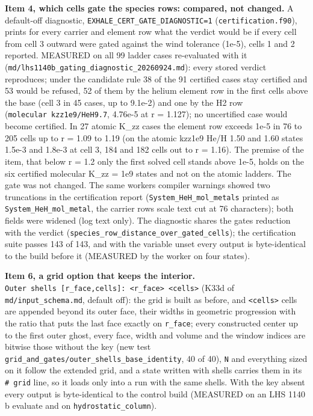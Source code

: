 \documentclass[english,a4paper]{my_memo}
\begin{document}
\textbf{Item 4, which cells gate the species rows: compared, not changed.} A
default-off diagnostic, \texttt{EXHALE\_CERT\_GATE\_DIAGNOSTIC=1} (\texttt{certification.f90}),
prints for every carrier and element row what the verdict would be if every
cell from cell 3 outward were gated against the wind tolerance (1e-5), cells 1
and 2 reported. MEASURED on all 99 ladder cases re-evaluated with it
(\texttt{md/lhs1140b\_gating\_diagnostic\_20260924.md}): every stored verdict
reproduces; under the candidate rule 38 of the 91 certified cases stay
certified and 53 would be refused, 52 of them by the helium element row in
the first cells above the base (cell 3 in 45 cases, up to 9.1e-2) and one by
the H2 row (\texttt{molecular\ kzz1e9/HeH9.7}, 4.76e-5 at r = 1.127); no uncertified
case would become certified. In 27 atomic K\_zz cases the element row exceeds
1e-5 in 76 to 205 cells up to r = 1.09 to 1.19 (on the atomic kzz1e9 He/H 1.50
and 1.60 states 1.5e-3 and 1.8e-3 at cell 3, 184 and 182 cells out to
r = 1.16). The premise of the item, that below r = 1.2 only the first solved
cell stands above 1e-5, holds on the six certified molecular K\_zz = 1e9
states and not on the atomic ladders. The gate was not changed. The same
worker\textquotesingle s compiler warnings showed two truncations in the certification report
(\texttt{System\_HeH\_mol\_metals} printed as \texttt{System\_HeH\_mol\_metal}, the carrier row\textquotesingle s
scale text cut at 76 characters); both fields were widened (log text only).
The diagnostic shares the gate\textquotesingle s reduction with the verdict
(\texttt{species\_row\_distance\_over\_gated\_cells}); the certification suite passes 143
of 143, and with the variable unset every output is byte-identical to the
build before it (MEASURED by the worker on four states).

\textbf{Item 6, a grid option that keeps the interior.} \texttt{Outer\ shells\ {[}r\_face,cells{]}:\ \textless{}r\_face\textgreater{}\ \textless{}cells\textgreater{}} (K33d of \texttt{md/input\_schema.md}, default
off): the grid is built as before, and \texttt{\textless{}cells\textgreater{}} cells are appended beyond its
outer face, their widths in geometric progression with the ratio that puts
the last face exactly on \texttt{r\_face}; every constructed center up to the first
outer ghost, every face, width and volume and the window indices are bitwise
those without the key (new test \texttt{grid\_and\_gates/outer\_shells\_base\_identity},
40 of 40), \texttt{N} and everything sized on it follow the extended grid, and a
state written with shells carries them in its \texttt{\#\ grid} line, so it loads only
into a run with the same shells. With the key absent every output is
byte-identical to the control build (MEASURED on an LHS 1140 b evaluate and on
\texttt{hydrostatic\_column}).
\end{document}
